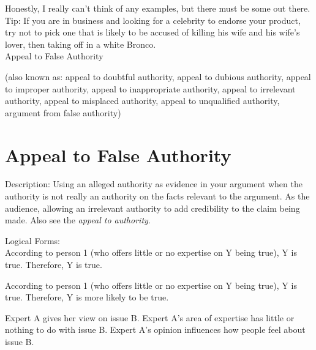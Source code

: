 \documentclass[a4paper,12pt,single,pdftex]{scrbook}
\begin{document}
    
      Honestly, I really can’t think of any examples, but there must be some out there.
    \\

    
      Tip: If you are in business and looking for a celebrity to endorse your product, try not to pick one that is likely to be accused of killing his wife and his wife’s lover, then taking off in a white Bronco.
    \\

  

Appeal to False Authority
    
      (also known as: appeal to doubtful authority, appeal to dubious authority, appeal to improper authority, appeal to inappropriate authority, appeal to irrelevant authority, appeal to misplaced authority, appeal to unqualified authority, argument from false authority)
    \\

  
    \chapter{
      Appeal to False Authority
    }
  
    
    Description: Using an alleged authority as evidence in your argument when the authority is not really an authority on the facts relevant to the argument. As the audience, allowing an irrelevant authority to add credibility to the claim being made. Also see the {\em {\it appeal to authority}}.

    
      Logical Forms:
    \\

    
      According to person 1 (who offers little or no expertise on Y being true), Y is true. \newline
Therefore, Y is true.
    \\

     \newline

    

    
      According to person 1 (who offers little or no expertise on Y being true), Y is true. \newline
Therefore, Y is more likely to be true.
    \\

     \newline

    

    
      Expert A gives her view on issue B. \newline
Expert A’s area of expertise has little or nothing to do with issue B. \newline
Expert A’s opinion influences how people feel about issue B.
    \\
\end{document}
